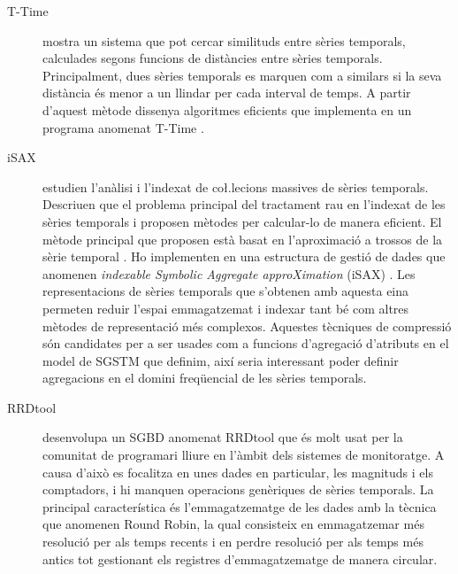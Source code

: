 \begin{description}


\item[T-Time] \textcite{assfalg08:thesis} mostra un sistema que pot
  cercar similituds entre sèries temporals, calculades segons funcions
  de distàncies entre sèries temporals. Principalment, dues sèries
  temporals es marquen com a similars si la seva distància és menor
  a un llindar per cada interval de temps. A partir d'aquest mètode dissenya
  algoritmes eficients que implementa en un programa anomenat
  T-Time \parencite{assfalg08:ttime}.

 
\item[iSAX] \textcite{keogh08:isax,keogh10:isax} estudien l'anàlisi i
  l'indexat de co\l.lecions massives de sèries temporals. Descriuen
  que el problema principal del tractament rau en l'indexat de les
  sèries temporals i proposen mètodes per calcular-lo de manera
  eficient. El mètode principal que proposen està basat en
  l'aproximació a trossos de la sèrie temporal \parencite{keogh00}.
  Ho implementen en una estructura de gestió de dades que anomenen
  \emph{indexable Symbolic Aggregate approXimation}
  (iSAX) \parencite{isax}. Les representacions de sèries temporals que
  s'obtenen amb aquesta eina permeten reduir l'espai emmagatzemat i
  indexar tant bé com altres mètodes de representació més complexos.
  Aquestes tècniques de compressió són candidates per a ser usades com
  a funcions d'agregació d'atributs en el model de \gls{SGSTM} que
  definim, així seria interessant poder definir agregacions en el
  domini freqüencial de les sèries temporals.






\item[RRDtool]
  \parencite{rrdtool,lisa98:oetiker} desenvolupa un \gls{SGBD}
  anomenat RRDtool que és molt usat per la comunitat de programari
  lliure en l'àmbit dels sistemes de monitoratge. A causa d'això es
  focalitza en unes dades en particular, les magnituds i els
  comptadors, i hi manquen operacions genèriques de sèries temporals.
  La principal característica és l'emmagatzematge de les dades amb la
  tècnica que anomenen Round Robin, la qual consisteix en emmagatzemar
  més resolució per als temps recents i en perdre resolució per als
  temps més antics tot gestionant els registres d'emmagatzematge de
  manera circular.


\end{description}
